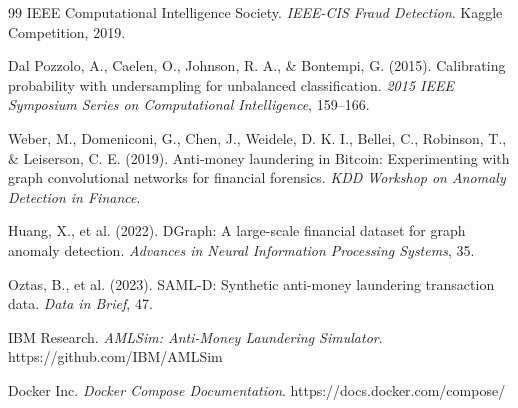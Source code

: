 \begin{thebibliography}{99}
IEEE Computational Intelligence Society.
\textit{IEEE-CIS Fraud Detection}.
Kaggle Competition, 2019.

Dal Pozzolo, A., Caelen, O., Johnson, R. A., \& Bontempi, G. (2015).
Calibrating probability with undersampling for unbalanced classification.
\textit{2015 IEEE Symposium Series on Computational Intelligence}, 159--166.

Weber, M., Domeniconi, G., Chen, J., Weidele, D. K. I., Bellei, C., Robinson, T., \& Leiserson, C. E. (2019).
Anti-money laundering in Bitcoin: Experimenting with graph convolutional networks for financial forensics.
\textit{KDD Workshop on Anomaly Detection in Finance}.

Huang, X., et al. (2022).
DGraph: A large-scale financial dataset for graph anomaly detection.
\textit{Advances in Neural Information Processing Systems}, 35.

Oztas, B., et al. (2023).
SAML-D: Synthetic anti-money laundering transaction data.
\textit{Data in Brief}, 47.

IBM Research.
\textit{AMLSim: Anti-Money Laundering Simulator}.
https://github.com/IBM/AMLSim

Docker Inc.
\textit{Docker Compose Documentation}.
https://docs.docker.com/compose/

\end{thebibliography}
